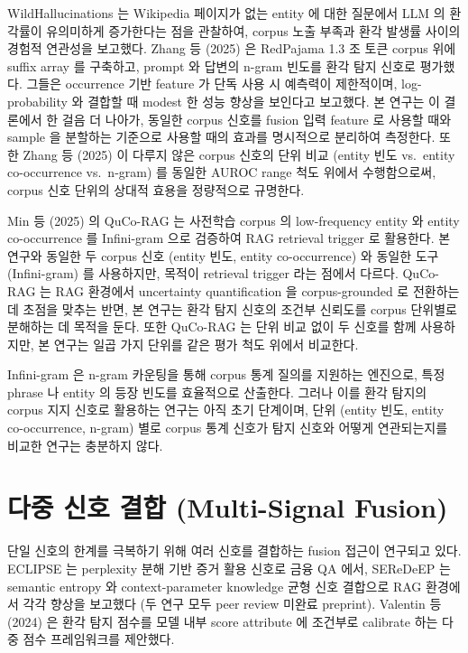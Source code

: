 \documentclass[oneside,ko,under]{snuthesis}
\begin{document}
WildHallucinations\cite{wildhallucinations2024} 는 Wikipedia 페이지가 없는 entity 에 대한 질문에서 LLM 의 환각률이 유의미하게 증가한다는 점을 관찰하여, corpus 노출 부족과 환각 발생률 사이의 경험적 연관성을 보고했다. Zhang 등 (2025)\cite{zhang2025corpus} 은 RedPajama 1.3 조 토큰 corpus 위에 suffix array 를 구축하고, prompt 와 답변의 n-gram 빈도를 환각 탐지 신호로 평가했다. 그들은 occurrence 기반 feature 가 단독 사용 시 예측력이 제한적이며, log-probability 와 결합할 때 modest 한 성능 향상을 보인다고 보고했다. 본 연구는 이 결론에서 한 걸음 더 나아가, 동일한 corpus 신호를 fusion 입력 feature 로 사용할 때와 sample 을 분할하는 기준으로 사용할 때의 효과를 명시적으로 분리하여 측정한다. 또한 Zhang 등 (2025) 이 다루지 않은 corpus 신호의 단위 비교 (entity 빈도 vs.\ entity co-occurrence vs.\ n-gram) 를 동일한 AUROC range 척도 위에서 수행함으로써, corpus 신호 단위의 상대적 효용을 정량적으로 규명한다.

Min 등 (2025)\cite{qucorag} 의 QuCo-RAG 는 사전학습 corpus 의 low-frequency entity 와 entity co-occurrence 를 Infini-gram 으로 검증하여 RAG retrieval trigger 로 활용한다. 본 연구와 동일한 두 corpus 신호 (entity 빈도, entity co-occurrence) 와 동일한 도구 (Infini-gram) 를 사용하지만, 목적이 retrieval trigger 라는 점에서 다르다. QuCo-RAG 는 RAG 환경에서 uncertainty quantification 을 corpus-grounded 로 전환하는 데 초점을 맞추는 반면, 본 연구는 환각 탐지 신호의 조건부 신뢰도를 corpus 단위별로 분해하는 데 목적을 둔다. 또한 QuCo-RAG 는 단위 비교 없이 두 신호를 함께 사용하지만, 본 연구는 일곱 가지 단위를 같은 평가 척도 위에서 비교한다.

Infini-gram\cite{infinigram2024} 은 n-gram 카운팅을 통해 corpus 통계 질의를 지원하는 엔진으로, 특정 phrase 나 entity 의 등장 빈도를 효율적으로 산출한다. 그러나 이를 환각 탐지의 corpus 지지 신호로 활용하는 연구는 아직 초기 단계이며, 단위 (entity 빈도, entity co-occurrence, n-gram) 별로 corpus 통계 신호가 탐지 신호와 어떻게 연관되는지를 비교한 연구는 충분하지 않다.

\section{다중 신호 결합 (Multi-Signal Fusion)}

단일 신호의 한계를 극복하기 위해 여러 신호를 결합하는 fusion 접근이 연구되고 있다. ECLIPSE\cite{singha2025eclipse} 는 perplexity 분해 기반 증거 활용 신호로 금융 QA 에서, SEReDeEP\cite{wang2025seredeep} 는 semantic entropy 와 context-parameter knowledge 균형 신호 결합으로 RAG 환경에서 각각 향상을 보고했다 (두 연구 모두 peer review 미완료 preprint). Valentin 등 (2024)\cite{valentin2024} 은 환각 탐지 점수를 모델 내부 score attribute 에 조건부로 calibrate 하는 다중 점수 프레임워크를 제안했다.
\end{document}
